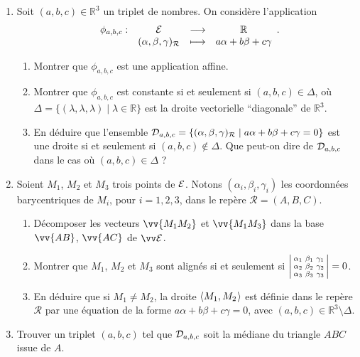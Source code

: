 \documentclass[a4paper,12pt,reqno]{amsart}
\begin{document}
\begin{exo}
\begin{enumerate}
    \item Soit $(a,b,c) \in \mathbb{R}^{3}$ un triplet de nombres. On considère l'application
      $$
        \begin{array}[t]{lccc}
          \phi_{a,b,c} : & \mathcal{E}                                 & \longrightarrow & \mathbb{R} \\
                         & ( \alpha, \beta, \gamma )_{\mathcal{R}} & \longmapsto     &  a\alpha + b\beta + c\gamma
        \end{array}.
      $$
      \begin{enumerate}
        \item Montrer que $\phi_{a,b,c}$ est une application affine.
        \item Montrer que $\phi_{a,b,c}$ est constante si et seulement si $(a,b,c) \in \Delta$, où $\Delta=\{ (\lambda,\lambda,\lambda) \mid \lambda \in \mathbb{R}\}$ est la droite vectorielle \enquote{diagonale} de $\mathbb{R}^{3}$.
        \item En déduire que l'ensemble $\mathcal{D}_{a,b,c}=\{ (\alpha, \beta, \gamma)_{\mathcal{R}} \mid a \alpha  + b \beta  + c\gamma  = 0\}$ est une droite si et seulement si $(a,b,c) \notin \Delta$. Que peut-on dire de $\mathcal{D}_{a,b,c}$ dans le cas où $(a,b,c) \in \Delta$ ?
      \end{enumerate}
    \item Soient $M_1$, $M_2$ et $M_3$ trois points de $\mathcal{E}$. Notons $(\alpha_i,\beta_i,\gamma_i)$ les coordonnées barycentriques de $M_i$, pour $i=1,2,3$, dans le repère $\mathcal{R} = (A,B,C)$.
    \begin{enumerate}
      \item Décomposer les vecteurs $\vv{M_1M_2}$ et $\vv{M_1M_3}$ dans la base $\vv{AB}$, $\vv{AC}$ de $\ev{E}$.
      \item Montrer que $M_1$, $M_2$ et $M_3$ sont alignés si et seulement si $\begin{vsmallmatrix}\alpha_1 &\beta_1&\gamma_1\\ \alpha_2 &\beta_2&\gamma_2\\ \alpha_3 &\beta_3&\gamma_3\end{vsmallmatrix}=0$.
      \item En déduire que si $M_{1} \neq M_{2}$, la droite $\langle{M_{1},M_{2}}\kern.07em\rangle$ est définie dans le repère $\mathcal{R}$ par une équation de la forme $a\alpha + b\beta + c\gamma  = 0$, avec $(a,b,c) \in \mathbb{R}^{3} \setminus \Delta$.
    \end{enumerate}
    \item Trouver un triplet $(a,b,c)$ tel que $\mathcal{D}_{a,b,c}$ soit la médiane du triangle $ABC$ issue de $A$.
  \end{enumerate}

\end{exo}
\end{document}
